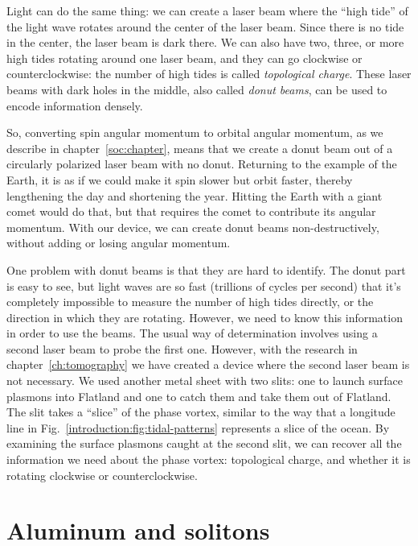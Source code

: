 Light can do the same thing: we can create a laser beam where the ``high tide'' of the light wave rotates around the center of the laser beam.
Since there is no tide in the center, the laser beam is dark there.
We can also have two, three, or more high tides rotating around one laser beam, and they can go clockwise or counterclockwise: the number of high tides is called \emph{topological charge}.
These laser beams with dark holes in the middle, also called \emph{donut beams}, can be used to encode information densely.%

So, converting spin angular momentum to orbital angular momentum, as we describe in chapter~\ref{soc:chapter}, means that we create a donut beam out of a circularly polarized laser beam with no donut.
Returning to the example of the Earth, it is as if we could make it spin slower but orbit faster, thereby lengthening the day and shortening the year.
Hitting the Earth with a giant comet would do that, but that requires the comet to contribute its angular momentum.
With our device, we can create donut beams non-destructively, without adding or losing angular momentum.

One problem with donut beams is that they are hard to identify.
The donut part is easy to see, but light waves are so fast (trillions of cycles per second) that it's completely impossible to measure the number of high tides directly, or the direction in which they are rotating.
However, we need to know this information in order to use the beams.
The usual way of determination involves using a second laser beam to probe the first one.
However, with the research in chapter~\ref{ch:tomography} we have created a device where the second laser beam is not necessary.
We used another metal sheet with two slits: one to launch surface plasmons into Flatland and one to catch them and take them out of Flatland.
The slit takes a ``slice'' of the phase vortex, similar to the way that a longitude line in Fig.~\ref{introduction:fig:tidal-patterns} represents a slice of the ocean.
By examining the surface plasmons caught at the second slit, we can recover all the information we need about the phase vortex: topological charge, and whether it is rotating clockwise or counterclockwise.

\section*{Aluminum and solitons}

